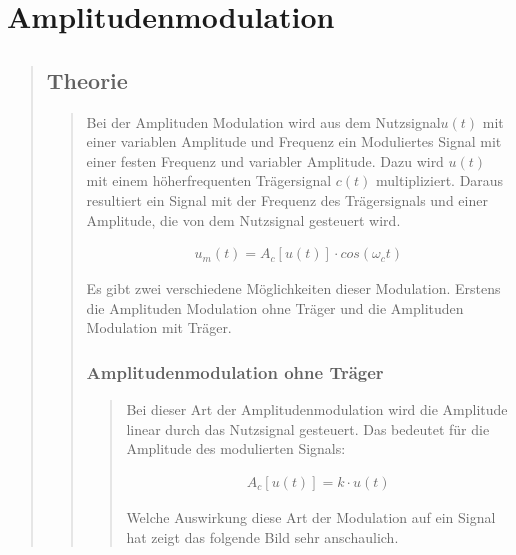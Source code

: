 \section{Amplitudenmodulation}
\begin{quote}
	\subsection{Theorie}
    \begin{quote}
        Bei der Amplituden Modulation wird aus dem Nutzsignal$u(t)$ mit einer variablen Amplitude und Frequenz ein
        Moduliertes Signal mit einer festen Frequenz und variabler Amplitude. Dazu wird $u(t)$ mit einem
        höherfrequenten Trägersignal $c(t)$ multipliziert. Daraus resultiert ein Signal mit der Frequenz des
        Trägersignals und einer Amplitude, die von dem Nutzsignal gesteuert wird.
        
        \begin{equation*}
        	\begin{split}
        		u_m(t) = A_c [u(t)] \cdot cos(\omega_c t)
        	\end{split}
        \end{equation*}
        
        Es gibt zwei verschiedene Möglichkeiten dieser Modulation. Erstens die Amplituden Modulation ohne Träger und die
        Amplituden Modulation mit Träger.
        
        \subsubsection{Amplitudenmodulation ohne Träger}
		\begin{quote}
			Bei dieser Art der Amplitudenmodulation wird die Amplitude linear durch das Nutzsignal gesteuert. Das bedeutet für
			die Amplitude des modulierten Signals:
			
			\begin{equation*}
            	\begin{split}
            		A_c [u(t)] = k \cdot u(t)
            	\end{split}
            \end{equation*}
            
            
            Welche Auswirkung diese Art der Modulation auf ein Signal hat zeigt das folgende Bild sehr anschaulich. 
            

\end{quote}
\end{quote}
\end{quote}
